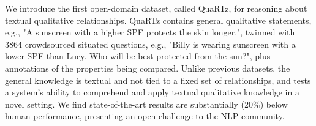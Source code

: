 We introduce the first open-domain dataset, called QuaRTz, for reasoning about textual qualitative relationships. QuaRTz contains general qualitative statements, e.g., "A sunscreen with a higher SPF protects the skin longer.", twinned with 3864 crowdsourced situated questions, e.g., "Billy is wearing sunscreen with a lower SPF than Lucy. Who will be best protected from the sun?", plus annotations of the properties being compared. Unlike previous datasets, the general knowledge is textual and not tied to a fixed set of relationships, and tests a system’s ability to comprehend and apply textual qualitative knowledge in a novel setting. We find state-of-the-art results are substantially (20\%) below human performance, presenting an open challenge to the NLP community.